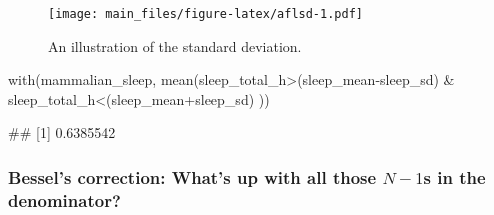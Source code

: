 \documentclass[
]{book}
\newenvironment{Shaded}{\begin{snugshade}}{\end{snugshade}}
\newcommand{\FunctionTok}[1]{\textcolor[rgb]{0.00,0.00,0.00}{#1}}
\newcommand{\NormalTok}[1]{#1}
\newcommand{\SpecialCharTok}[1]{\textcolor[rgb]{0.00,0.00,0.00}{#1}}
\begin{document}
\begin{figure}
\centering
\texttt{[image: main\_files/figure-latex/aflsd-1.pdf]}
\caption{\label{fig:aflsd}An illustration of the standard deviation.}
\end{figure}

\begin{Shaded}
\begin{Highlighting}[]
  \FunctionTok{with}\NormalTok{(mammalian\_sleep, }\FunctionTok{mean}\NormalTok{(sleep\_total\_h}\SpecialCharTok{\textgreater{}}\NormalTok{(sleep\_mean}\SpecialCharTok{{-}}\NormalTok{sleep\_sd) }\SpecialCharTok{\&}\NormalTok{ sleep\_total\_h}\SpecialCharTok{\textless{}}\NormalTok{(sleep\_mean}\SpecialCharTok{+}\NormalTok{sleep\_sd) ))}
\end{Highlighting}
\end{Shaded}

\begin{Shaded}
\begin{Highlighting}[]
\NormalTok{\#\# [1] 0.6385542}
\end{Highlighting}
\end{Shaded}

\hypertarget{bessels-correction-whats-up-with-all-those-n-1s-in-the-denominator}{%
\subsubsection{\texorpdfstring{Bessel's correction: What's up with all those \(N-1\)s in the denominator?}{Bessel's correction: What's up with all those N-1s in the denominator?}}\label{bessels-correction-whats-up-with-all-those-n-1s-in-the-denominator}}
\end{document}
